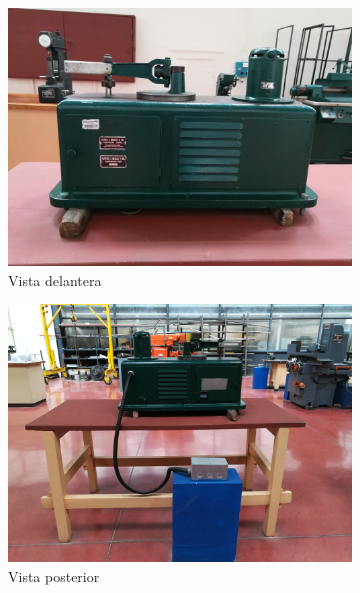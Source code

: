 \begin{figure}[h]
\centering
	\begin{subfigure}{0.49\linewidth}
		\centering	
		\includegraphics[width=1\linewidth]{Imagenes/maq_del.jpg}
		\caption{Vista delantera}\label{fig:maq_del}
	\end{subfigure}
	\begin{subfigure}{0.49\linewidth}
		\centering		
		\includegraphics[width=1\linewidth]{Imagenes/maqfull_post.jpg}
		\caption{Vista posterior}\label{fig:maqfull_post}
	\end{subfigure}
	\begin{subfigure}{0.5\linewidth}
		\centering		

\end{subfigure}
\end{figure}
